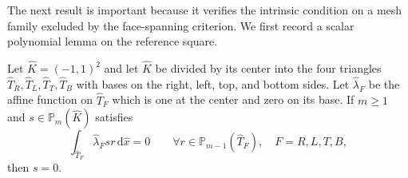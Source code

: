 \documentclass[review,hidelinks,onefignum,onetabnum]{siamart251216}
\begin{document}
The next result is important because it verifies the intrinsic condition
on a mesh family excluded by the face-spanning criterion.  We first record a
scalar polynomial lemma on the reference square.

\begin{lemma}\label{lem:square-moments}
Let $\widehat K=(-1,1)^2$ and let $\widehat K$ be divided by its center into
the four triangles $\widehat T_R,\widehat T_L,\widehat T_T,\widehat T_B$
with bases on the right, left, top, and bottom sides.  Let
$\widehat\lambda_F$ be the affine function on $\widehat T_F$ which is one at
the center and zero on its base.  If $m\ge1$ and
$s\in\mathbb P_m(\widehat K)$ satisfies
\begin{equation}\label{eq:square-weighted-moments}
 \int_{\widehat T_F}\widehat\lambda_F s r\,\mathrm d\widehat x=0
 \qquad\forall r\in\mathbb P_{m-1}(\widehat T_F),
 \quad F=R,L,T,B,
\end{equation}
then $s=0$.
\end{lemma}
\end{document}
